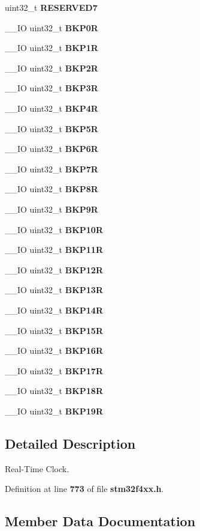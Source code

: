 \begin{DoxyCompactItemize}
\item 
uint32\+\_\+t \textbf{ R\+E\+S\+E\+R\+V\+E\+D7}
\item 
\+\_\+\+\_\+\+IO uint32\+\_\+t \textbf{ B\+K\+P0R}
\item 
\+\_\+\+\_\+\+IO uint32\+\_\+t \textbf{ B\+K\+P1R}
\item 
\+\_\+\+\_\+\+IO uint32\+\_\+t \textbf{ B\+K\+P2R}
\item 
\+\_\+\+\_\+\+IO uint32\+\_\+t \textbf{ B\+K\+P3R}
\item 
\+\_\+\+\_\+\+IO uint32\+\_\+t \textbf{ B\+K\+P4R}
\item 
\+\_\+\+\_\+\+IO uint32\+\_\+t \textbf{ B\+K\+P5R}
\item 
\+\_\+\+\_\+\+IO uint32\+\_\+t \textbf{ B\+K\+P6R}
\item 
\+\_\+\+\_\+\+IO uint32\+\_\+t \textbf{ B\+K\+P7R}
\item 
\+\_\+\+\_\+\+IO uint32\+\_\+t \textbf{ B\+K\+P8R}
\item 
\+\_\+\+\_\+\+IO uint32\+\_\+t \textbf{ B\+K\+P9R}
\item 
\+\_\+\+\_\+\+IO uint32\+\_\+t \textbf{ B\+K\+P10R}
\item 
\+\_\+\+\_\+\+IO uint32\+\_\+t \textbf{ B\+K\+P11R}
\item 
\+\_\+\+\_\+\+IO uint32\+\_\+t \textbf{ B\+K\+P12R}
\item 
\+\_\+\+\_\+\+IO uint32\+\_\+t \textbf{ B\+K\+P13R}
\item 
\+\_\+\+\_\+\+IO uint32\+\_\+t \textbf{ B\+K\+P14R}
\item 
\+\_\+\+\_\+\+IO uint32\+\_\+t \textbf{ B\+K\+P15R}
\item 
\+\_\+\+\_\+\+IO uint32\+\_\+t \textbf{ B\+K\+P16R}
\item 
\+\_\+\+\_\+\+IO uint32\+\_\+t \textbf{ B\+K\+P17R}
\item 
\+\_\+\+\_\+\+IO uint32\+\_\+t \textbf{ B\+K\+P18R}
\item 
\+\_\+\+\_\+\+IO uint32\+\_\+t \textbf{ B\+K\+P19R}
\end{DoxyCompactItemize}


\subsection{Detailed Description}
Real-\/\+Time Clock. 

Definition at line \textbf{ 773} of file \textbf{ stm32f4xx.\+h}.



\subsection{Member Data Documentation}
\mbox{\label{structRTC__TypeDef_ac005b1a5bc52634d5a34578cc9d2c3f6}} 
